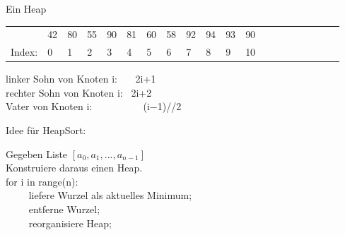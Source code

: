 \documentclass{beamer}
\begin{document}
\begin{frame}[fragile]
Ein Heap 

 \pause 

\begin{tabular}{llllllllllllllllllll}
& 42 & 80 & 55 & 90 & 81 & 60 & 58 & 92 & 94 & 93 & 90 \\
Index: & 0 & 1 & 2 & 3 & 4 & 5 & 6 & 7 & 8 & 9 & 10
\end{tabular}

linker Sohn von Knoten i: ~~~\pause 2i+1  \\
rechter Sohn von Knoten i:  ~\pause 2i+2  \\
Vater von Knoten i: ~~~~~~~~~ \pause (i$-$1)//2

\end{frame}

\begin{frame}[fragile]
Idee für HeapSort: 

Gegeben Liste $[a_0, a_1, ... , a_{n-1}]$ \\ 
Konstruiere daraus einen Heap. \\ 
for i in range(n):\\  
~~~~ liefere Wurzel als aktuelles Minimum; \\  
~~~~ entferne Wurzel; \\ 
~~~~ reorganisiere Heap; \\


\end{frame}
\end{document}
